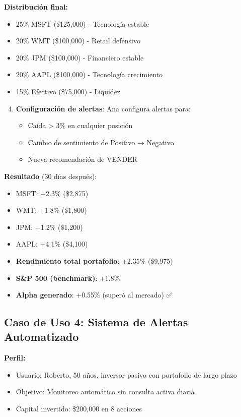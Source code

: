 \documentclass[12pt,a4paper]{report}
\begin{document}
\textbf{Distribución final:}
\begin{itemize}
    \item 25\% MSFT (\$125,000) - Tecnología estable
    \item 20\% WMT (\$100,000) - Retail defensivo
    \item 20\% JPM (\$100,000) - Financiero estable
    \item 20\% AAPL (\$100,000) - Tecnología crecimiento
    \item 15\% Efectivo (\$75,000) - Liquidez
\end{itemize}

\begin{enumerate}
    \setcounter{enumi}{3}
    \item \textbf{Configuración de alertas}: Ana configura alertas para:
    \begin{itemize}
        \item Caída > 3\% en cualquier posición
        \item Cambio de sentimiento de Positivo → Negativo
        \item Nueva recomendación de VENDER
    \end{itemize}
\end{enumerate}

\textbf{Resultado} (30 días después):
\begin{itemize}
    \item MSFT: +2.3\% (\$2,875)
    \item WMT: +1.8\% (\$1,800)
    \item JPM: +1.2\% (\$1,200)
    \item AAPL: +4.1\% (\$4,100)
    \item \textbf{Rendimiento total portafolio}: +2.35\% (\$9,975)
    \item \textbf{S\&P 500 (benchmark)}: +1.8\%
    \item \textbf{Alpha generado}: +0.55\% (superó al mercado) ✅
\end{itemize}

\subsection{Caso de Uso 4: Sistema de Alertas Automatizado}

\textbf{Perfil:}
\begin{itemize}
    \item Usuario: Roberto, 50 años, inversor pasivo con portafolio de largo plazo
    \item Objetivo: Monitoreo automático sin consulta activa diaria
    \item Capital invertido: \$200,000 en 8 acciones
\end{itemize}
\end{document}
